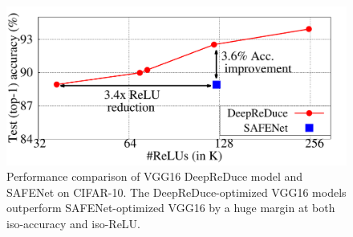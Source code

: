\begin{figure}[t] \centering
\includegraphics[scale=0.45]{Figures/ParetoFrontier_vgg16}
\vspace{-2em}
\caption{
Performance comparison of VGG16 DeepReDuce model and SAFENet on CIFAR-10. The DeepReDuce-optimized VGG16 models outperform SAFENet-optimized VGG16 by a huge margin at both iso-accuracy and iso-ReLU.}
\vspace{-2em}
\label{fig:ParetoFrontierVGG16}
\end{figure}
